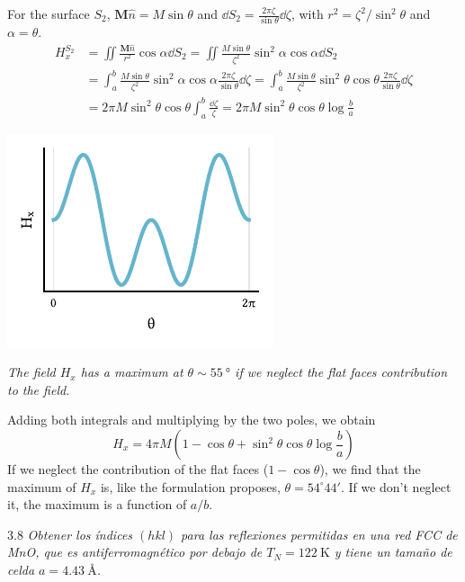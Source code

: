 \documentclass{tufte-book}
\newcommand{\sub}[1]{_{{\scriptscriptstyle\mathit{#1}}}}
\begin{document}
For the surface $S_2$, $\mathbf{M}\hat{n} = M \sin θ$ and $\dd{S_2} =
\frac{2π ζ }{\sin θ} \dd{ζ}$, with $r^2 = ζ^2 / \sin^2 θ$ and $α =
θ$.
\begin{equation*}
  \begin{split}
    H_x^{S_2} &= \iint \frac{\mathbf{M}\hat{n}}{r^2} \cos α \dd{S_2}
    = \iint \frac{M \sin θ}{ζ^2} \sin^2 α \cos α \dd{S_2} \\
    &= \int _a^b \frac{M \sin θ}{ζ^2} \sin^2 α \cos α  \frac{2πζ}{\sin θ} \dd{ζ}
    = \int _a^b \frac{M \sin θ}{ζ^2} \sin^2 θ \cos θ \frac{2πζ}{\sin θ}
    \dd{ζ} \\
    &= 2πM\sin^2θ \cos θ\int _a^b \frac{\dd{ζ}}{ζ} = 2π M \sin^2 θ \cos θ
    \log \frac{b}{a}
  \end{split}
\end{equation*}

\begin{marginfigure}
  \centering
  \includegraphics{figures/sineplot.pdf}
  \caption{\itshape The field $H_x$ has a maximum at $θ ∼ \SI{55}{\degree}$ if we
    neglect the flat faces contribution to the field.}
  \label{fig:sineplot}
\end{marginfigure}
Adding both integrals and multiplying by the two poles, we obtain
\begin{equation*}
  \boxed{
    H_x = 4πM \left( 1 - \cos θ + \sin^2 θ \cos θ \log \frac{b}{a} \right)
  }
\end{equation*}
If we neglect the contribution of the flat faces ($1-\cos θ$), we
find that the maximum of $H_x$ is, like the formulation proposes, $θ =
54^\circ 44'$. If we don't neglect it, the maximum is a function of $a/b$.

\begin{tcolorbox}[halign=left]
  \lettrine[lines=2]{\color{blue!50!white}3.8}{}
  \emph{
    Obtener los índices $(hkl)$ para las reflexiones permitidas en
    una red FCC de MnO, que es antiferromagnético por debajo de
    $T\sub{N}=\SI{122}{\kelvin}$ y tiene un tamaño de celda
    $a=\SI{4.43}{\angstrom}$.
    }
\end{tcolorbox}
\end{document}
